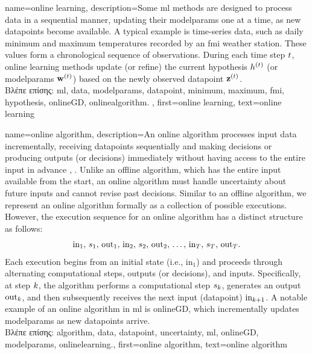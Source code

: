 {name={online learning},
	description={Some \gls{ml} methods  are designed to process \gls{data} in a sequential 
		manner, updating their \glspl{modelparam} one at a time, as new \gls{datapoint}s become available. 
		A typical example is time-series \gls{data}, such as daily \gls{minimum} and \gls{maximum} temperatures 
		recorded by an \gls{fmi} weather station. These values form a chronological sequence 
		of observations. During each time step $t$, online learning methods update (or refine)  
		the current \gls{hypothesis} $h^{(t)}$ (or \glspl{modelparam} ${\bf w}^{(t)}$) 
		based on the newly observed \gls{datapoint} ${\bf z}^{(t)}$.  \\ 
		\foreignlanguage{greek}{Βλέπε επίσης:} \gls{ml}, \gls{data}, \glspl{modelparam}, \gls{datapoint}, 
		\gls{minimum}, \gls{maximum}, \gls{fmi}, \gls{hypothesis}, \gls{onlineGD}, \gls{onlinealgorithm}.  },
	first={online learning},
	text={online learning} 
}

{name={online algorithm},
	description={An online \gls{algorithm} processes input \gls{data} incrementally, 
		receiving \gls{datapoint}s sequentially and making decisions or producing outputs (or decisions) immediately 
		without having access to the entire input in advance \cite{PredictionLearningGames}, \cite{HazanOCO}. 
		Unlike an offline \gls{algorithm}, which has the entire input available from the start, an online \gls{algorithm} 
		must handle \gls{uncertainty} about future inputs and cannot revise past decisions. Similar to an 
		offline \gls{algorithm}, we represent an online \gls{algorithm} formally as a collection of possible 
		executions. However, the execution sequence for an online \gls{algorithm} has a distinct structure as follows:
		$${\rm in}_{1}, \,s_1, \,{\rm out}_{1}, \,{\rm in}_{2}, \,s_2, \,{\rm out}_{2}, \,\ldots, \,{\rm in}_{T}, \,s_T, \,{\rm out}_{T}.$$ 
		Each execution begins from an initial state (i.e., \(\text{in}_{1}\)) and proceeds through alternating 
		computational steps, outputs (or decisions), and inputs. Specifically, at step \(k\), 
		the \gls{algorithm} performs a computational step \(s_{k}\), generates an output \(\text{out}_{k}\), 
		and then subsequently receives the next input (\gls{datapoint}) \(\text{in}_{k+1}\). A 
		notable example of an online \gls{algorithm} in \gls{ml} is \gls{onlineGD}, which incrementally 
		updates \glspl{modelparam} as new \gls{datapoint}s arrive. 
					\\ 
		\foreignlanguage{greek}{Βλέπε επίσης:} \gls{algorithm}, \gls{data}, \gls{datapoint}, \gls{uncertainty}, \gls{ml}, 
		\gls{onlineGD}, \glspl{modelparam}, \gls{onlinelearning}.},
	first={online algorithm},
	text={online algorithm} 
}

